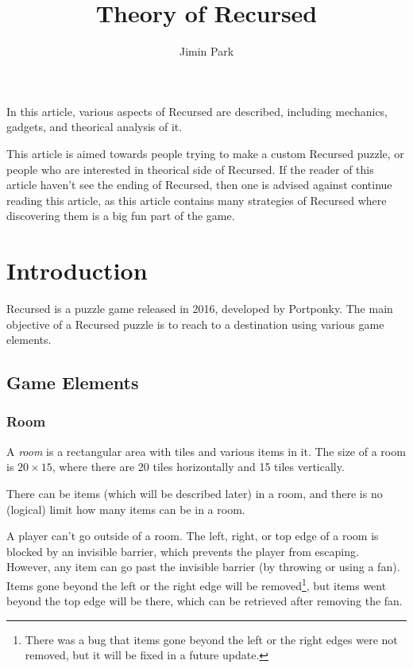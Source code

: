 \documentclass[a4paper]{article}
\theoremstyle{theorem}
\theoremstyle{definition}
\begin{document}
\title{Theory of Recursed}
\author{Jimin Park}
\maketitle

In this article, various aspects of Recursed are described, including mechanics, gadgets, and theorical analysis of it.

This article is aimed towards people trying to make a custom Recursed puzzle, or people who are interested in theorical side of Recursed.
If the reader of this article haven't see the ending of Recursed, then one is advised against continue reading this article,
as this article contains many strategies of Recursed where discovering them is a big fun part of the game.

\tableofcontents

\section{Introduction}
Recursed is a puzzle game released in 2016, developed by Portponky.
The main objective of a Recursed puzzle is to reach to a destination using various game elements.

\subsection{Game Elements}

\subsubsection{Room}
A \emph{room} is a rectangular area with tiles and various items in it.
The size of a room is $20\times15$, where there are 20 tiles horizontally and 15 tiles vertically.

There can be items (which will be described later) in a room, and there is no (logical) limit how many items can be in a room.

A player can't go outside of a room. The left, right, or top edge of a room is blocked by an invisible barrier,
which prevents the player from escaping. However, any item can go past the invisible barrier (by throwing or using a fan).
Items gone beyond the left or the right edge will be removed\footnote{There was a bug that items gone beyond the left or the right
edges were not removed, but it will be fixed in a future update.},
but items went beyond the top edge will be there, which can be retrieved after removing the fan.
\end{document}
